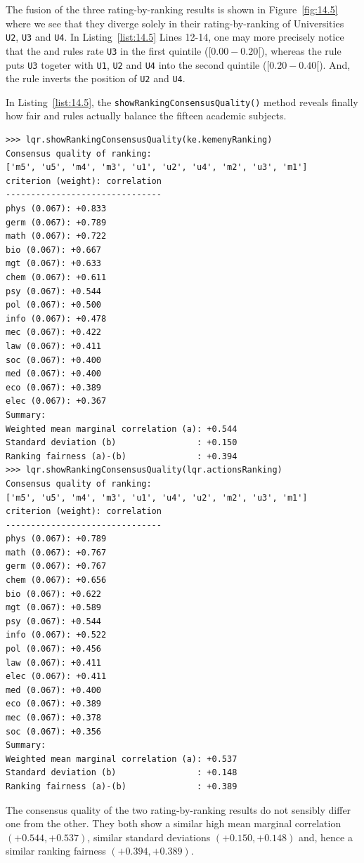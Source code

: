 The fusion of the three rating-by-ranking results is shown in Figure~\vref{fig:14.5} where we see that they diverge solely in their rating-by-ranking of Universities \texttt{U2}, \texttt{U3} and \texttt{U4}. In Listing~\vref{list:14.5} Lines 12-14, one may more precisely notice that the \Kemeny and \Copeland rules rate \texttt{U3} in the first quintile ($[0.00- 0.20[$), whereas the \NetFlows rule puts \texttt{U3} togeter with \texttt{U1}, \texttt{U2} and \texttt{U4} into the second quintile ($[0.20- 0.40[$). And, the \Kemeny rule inverts the position of \texttt{U2} and \texttt{U4}.

In Listing~\vref{list:14.5}, the \texttt{showRankingConsensusQuality()} method reveals finally how fair \Kemeny and \Copeland rules actually balance the fifteen academic subjects. 
\begin{lstlisting}[caption={Checking the consensus quality of \Kemeny and \Copeland rankings},label=list:14.5,basicstyle=\ttfamily\scriptsize]
>>> lqr.showRankingConsensusQuality(ke.kemenyRanking)
Consensus quality of ranking:
['m5', 'u5', 'm4', 'm3', 'u1', 'u2', 'u4', 'm2', 'u3', 'm1']
criterion (weight): correlation
-------------------------------
phys (0.067): +0.833
germ (0.067): +0.789
math (0.067): +0.722
bio (0.067): +0.667
mgt (0.067): +0.633
chem (0.067): +0.611
psy (0.067): +0.544
pol (0.067): +0.500
info (0.067): +0.478
mec (0.067): +0.422
law (0.067): +0.411
soc (0.067): +0.400
med (0.067): +0.400
eco (0.067): +0.389
elec (0.067): +0.367
Summary:
Weighted mean marginal correlation (a): +0.544
Standard deviation (b)                : +0.150
Ranking fairness (a)-(b)              : +0.394
>>> lqr.showRankingConsensusQuality(lqr.actionsRanking)
Consensus quality of ranking:
['m5', 'u5', 'm4', 'm3', 'u1', 'u4', 'u2', 'm2', 'u3', 'm1']
criterion (weight): correlation
-------------------------------
phys (0.067): +0.789
math (0.067): +0.767
germ (0.067): +0.767
chem (0.067): +0.656
bio (0.067): +0.622
mgt (0.067): +0.589
psy (0.067): +0.544
info (0.067): +0.522
pol (0.067): +0.456
law (0.067): +0.411
elec (0.067): +0.411
med (0.067): +0.400
eco (0.067): +0.389
mec (0.067): +0.378
soc (0.067): +0.356
Summary:
Weighted mean marginal correlation (a): +0.537
Standard deviation (b)                : +0.148
Ranking fairness (a)-(b)              : +0.389
\end{lstlisting}

The consensus quality of the two rating-by-ranking results do not sensibly differ one from the other. They both show a similar high mean marginal correlation $(+0.544, +0.537)$, similar standard deviations $(+0.150, +0.148)$ and, hence a similar ranking fairness $(+0.394, +0.389)$. 

